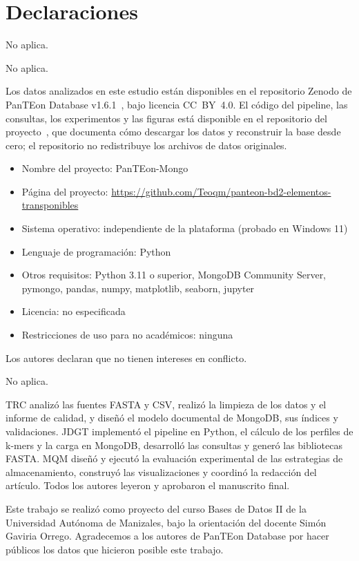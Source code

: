 \documentclass[pdflatex,sn-vancouver-num,lineno,referee]{sn-jnl}
\begin{document}
\backmatter

\section*{Declaraciones}

No aplica.

No aplica.

Los datos analizados en este estudio están disponibles en el repositorio
Zenodo de PanTEon Database v1.6.1~\cite{panteon2026zenodo}, bajo licencia
CC~BY~4.0. El código del pipeline, las consultas, los experimentos y las
figuras está disponible en el repositorio del proyecto~\cite{repo2026}, que
documenta cómo descargar los datos y reconstruir la base desde cero; el
repositorio no redistribuye los archivos de datos originales.
\begin{itemize}
\item Nombre del proyecto: PanTEon-Mongo
\item Página del proyecto: \url{https://github.com/Teoqm/panteon-bd2-elementos-transponibles}
\item Sistema operativo: independiente de la plataforma (probado en Windows 11)
\item Lenguaje de programación: Python
\item Otros requisitos: Python 3.11 o superior, MongoDB Community Server, pymongo, pandas, numpy, matplotlib, seaborn, jupyter
\item Licencia: no especificada
\item Restricciones de uso para no académicos: ninguna
\end{itemize}

Los autores declaran que no tienen intereses en conflicto.

No aplica.

TRC analizó las fuentes FASTA y CSV, realizó la limpieza de los datos y el
informe de calidad, y diseñó el modelo documental de MongoDB, sus índices y
validaciones. JDGT implementó el pipeline en Python, el cálculo de los
perfiles de k-mers y la carga en MongoDB, desarrolló las consultas y generó
las bibliotecas FASTA. MQM diseñó y ejecutó la evaluación experimental de las
estrategias de almacenamiento, construyó las visualizaciones y coordinó la
redacción del artículo. Todos los autores leyeron y aprobaron el manuscrito
final.

Este trabajo se realizó como proyecto del curso Bases de Datos II de la
Universidad Autónoma de Manizales, bajo la orientación del docente Simón
Gaviria Orrego. Agradecemos a los autores de PanTEon Database por hacer
públicos los datos que hicieron posible este trabajo.


\end{document}
